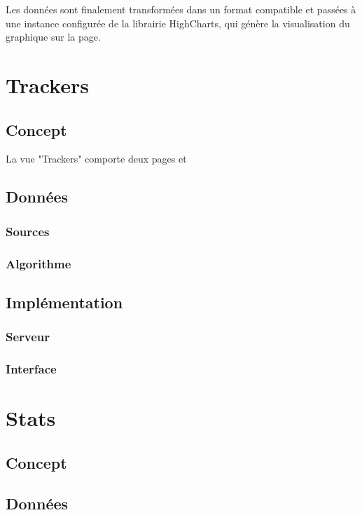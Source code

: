 			Les données sont finalement transformées dans un format compatible et passées à une instance configurée de la librairie HighCharts, qui génère la visualisation du graphique sur la page.

\section{Trackers}

	\subsection{Concept}

		La vue "Trackers" comporte deux pages et 

	\subsection{Données}

		\subsubsection{Sources}

		\subsubsection{Algorithme}

	\subsection{Implémentation}

		\subsubsection{Serveur}

		\subsubsection{Interface}

\section{Stats}

	\subsection{Concept}

	\subsection{Données}

